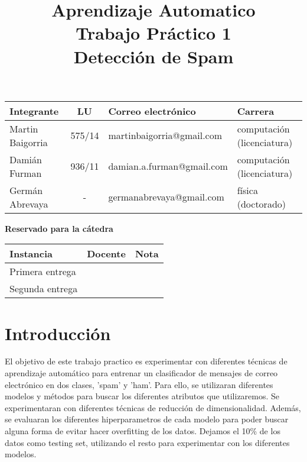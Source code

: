 \documentclass[10pt,a4paper]{article}
\title{Aprendizaje Automatico \\ Trabajo Práctico 1 \\ Detección de Spam }
\begin{document}

\maketitle

\bigskip

\begin{table}[h]
\centering
\begin{tabular}{|l l l l|}
\hline
Integrante       & \multicolumn{1}{c}{LU}     & Correo electrónico       	& Carrera \\ \hline
Martin Baigorria & \multicolumn{1}{c}{575/14} & martinbaigorria@gmail.com & computación (licenciatura) \\ 
Damián Furman & \multicolumn{1}{c}{936/11}& damian.a.furman@gmail.com & computación (licenciatura)\\
Germán Abrevaya & \multicolumn{1}{c}{-} & germanabrevaya@gmail.com & física (doctorado)\\ \hline
\end{tabular}
\end{table}

\vfill

\begin{center}
\textbf{Reservado para la cátedra}
\end{center}
\begin{table}[h]
\centering
\begin{tabular}{|l|l|l|}
\hline
Instancia       & Docente & Nota \\ \hline
Primera entrega &         &      \\ \hline
Segunda entrega &         &      \\ \hline
\end{tabular}
\end{table}

\newpage
\tableofcontents
\newpage


\section{Introducción}

El objetivo de este trabajo practico es experimentar con diferentes técnicas de aprendizaje automático para entrenar un clasificador de mensajes de correo electrónico en dos clases, 'spam' y 'ham'. Para ello, se utilizaran diferentes modelos y métodos para buscar los diferentes atributos que utilizaremos. Se experimentaran con diferentes técnicas de reducción de dimensionalidad. Además, se evaluaran los diferentes hiperparametros de cada modelo para poder buscar alguna forma de evitar hacer overfitting de los datos. Dejamos el 10\% de los datos como testing set, utilizando el resto para experimentar con los diferentes modelos.
\end{document}
